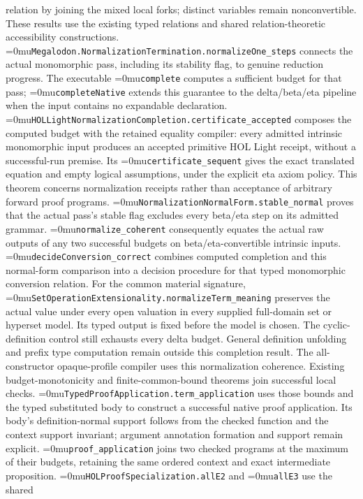 \documentclass[11pt]{article}
\newcommand{\leanname}[1]{\textup{\Urlmuskip=0mu\relax\nolinkurl{#1}}}
\theoremstyle{definition}
\theoremstyle{remark}
\begin{document}
relation by joining the mixed local forks; distinct variables remain
nonconvertible. These results use the existing typed relations and shared
relation-theoretic accessibility constructions.
\leanname{Megalodon.NormalizationTermination.normalizeOne_steps} connects
the actual monomorphic pass, including its stability flag, to genuine
reduction progress. The executable \leanname{complete} computes a sufficient
budget for that pass; \leanname{completeNative} extends this guarantee to the
delta/beta/eta pipeline when the input contains no expandable declaration.
\leanname{HOLLightNormalizationCompletion.certificate_accepted} composes the
computed budget with the retained equality compiler: every admitted intrinsic
monomorphic input produces an accepted primitive HOL Light receipt, without a
successful-run premise. Its \leanname{certificate_sequent} gives the exact
translated equation and empty logical assumptions, under the explicit eta
axiom policy. This theorem concerns normalization receipts rather than
acceptance of arbitrary forward proof programs.
\leanname{NormalizationNormalForm.stable_normal} proves that the actual
pass's stable flag excludes every beta/eta step on its admitted grammar.
\leanname{normalize_coherent} consequently equates the actual raw outputs
of any two successful budgets on beta/eta-convertible intrinsic inputs.
\leanname{decideConversion_correct} combines computed completion and this
normal-form comparison into a decision procedure for that typed monomorphic
conversion relation.
For the common material signature,
\leanname{SetOperationExtensionality.normalizeTerm_meaning} preserves the
actual value under every open valuation in every supplied full-domain set or
hyperset model. Its typed output is fixed before the model is chosen.
The cyclic-definition control still exhausts every delta budget. General
definition unfolding and prefix type computation remain outside this
completion result. The all-constructor opaque-profile compiler uses this
normalization coherence. Existing budget-monotonicity and finite-common-bound
theorems join successful local checks.
\leanname{TypedProofApplication.term_application} uses those bounds and the
typed substituted body to construct a successful native proof application.
Its body's definition-normal support follows from the checked function and
the context support invariant; argument annotation formation and support
remain explicit. \leanname{proof_application} joins two checked programs at
the maximum of their budgets, retaining the same ordered context and exact
intermediate proposition.
\leanname{HOLProofSpecialization.allE2} and \leanname{allE3} use the shared
\end{document}
